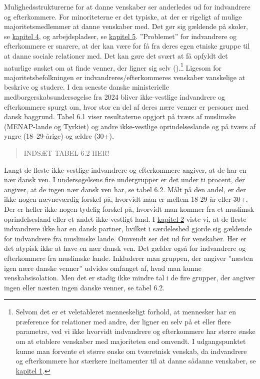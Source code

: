 \documentclass[
]{book}
\begin{document}
Mulighedsstrukturerne for at danne venskaber ser anderledes ud for indvandrere og efterkommere. For minoriteterne er det typiske, at der er rigeligt af mulige majoritetsmedlemmer at danne venskaber med. Det gør sig gældende på skoler, se \hyperref[kap4]{kapitel 4}, og arbejdspladser, se \hyperref[kap5]{kapitel 5}. ''Problemet'' for indvandrere og efterkommere er snarere, at der kan være for få fra deres egen etniske gruppe til at danne sociale relationer med. Det kan gøre det svært at få opfyldt det naturlige ønsket om at finde venner, der ligner sig selv ().\footnote{Selvom det er et veletableret menneskeligt forhold, at mennesker har en præference for relationer med andre, der ligner en selv på et eller flere parametre, ved vi ikke hvorvidt indvandrere og efterkommere har større ønske om at etablere venskaber med majoriteten end omvendt. I udgangspunktet kunne man forvente et større ønske om tværetnisk venskab, da indvandrere og efterkommere har stærkere incitamenter til at danne sådanne venskaber, se \hyperref[kap1]{kapitel 1}.} Ligesom for majoritetsbefolkningen er indvandreres/efterkommeres venskaber vanskelige at beskrive og studere. I den seneste danske ministerielle medborgerskabsundersøgelse fra 2024 bliver ikke-vestlige indvandrere og efterkommere spurgt om, hvor stor en del af deres nære venner er personer med dansk baggrund. Tabel 6.1 viser resultaterne opgjort på tværs af muslimske (MENAP-lande og Tyrkiet) og andre ikke-vestlige oprindelseslande og på tværs af yngre (18--29-årige) og ældre (30+).

\begin{quote}
INDSÆT TABEL 6.2 HER!
\end{quote}

Langt de fleste ikke-vestlige indvandrere og efterkommere angiver, at de har en nær dansk ven. I undersøgelsens fire undergrupper er det under ti procent, der angiver, at de ingen nær dansk ven har, se tabel 6.2. Målt på den andel, er der ikke nogen nævneværdig forskel på, hvorvidt man er mellem 18-29 år eller 30+. Der er heller ikke nogen tydelig forskel på, hvorvidt man kommer fra et muslimsk oprindelsesland eller et andet ikke-vestligt land. I \hyperref[kap2]{kapitel 2} viste vi, at de fleste indvandrere ikke har en dansk partner, hvilket i særdeleshed gjorde sig gældende for indvandrere fra muslimske lande. Omvendt ser det ud for venskaber. Her er det atypisk ikke at have en nær dansk ven. Det gælder også for indvandrere og efterkommere fra muslimske lande. Inkluderer man gruppen, der angiver ''næsten igen nære danske venner'' udvides omfanget af, hvad man kunne venskabsisolation. Men det er stadig ikke mindre tal i de fire grupper, der angiver ingen eller næsten ingen danske venner, se tabel 6.2.
\end{document}
